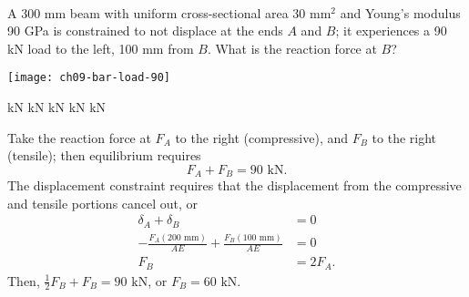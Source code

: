 \variant
\\
\begin{minipage}[t]{3in}
A 300 mm beam with uniform cross-sectional area 30 mm$^2$ and Young's modulus 90 GPa is constrained to not displace at the ends $A$ and $B$; it experiences a 90 kN load to the left, 100 mm from $B$. What is the reaction force at $B$?
\end{minipage}
\quad
\begin{minipage}[t]{3in}
\vspace{-24pt}
\texttt{[image: ch09-bar-load-90]}
\end{minipage}
\vspace{-12pt}
\begin{answers}
 kN
 kN
 kN
 kN
 kN
\end{answers}
\begin{solution}
Take the reaction force at $F_A$ to the right (compressive), and $F_B$ to the right (tensile); then equilibrium requires
\[
F_A + F_B = 90\text{ kN}.
\]
The displacement constraint requires that the displacement from the compressive and tensile portions cancel out, or
\[
\begin{split}
\delta_{A} + \delta_B &= 0\\
-\frac{F_A(200\text{ mm})}{AE} + \frac{F_B(100\text{ mm})}{AE} &= 0\\
F_B &= 2F_A.
\end{split}
\]
Then, $\frac12 F_B + F_B = 90\text{ kN}$, or $F_B = 60\text{ kN}$.
\end{solution}

